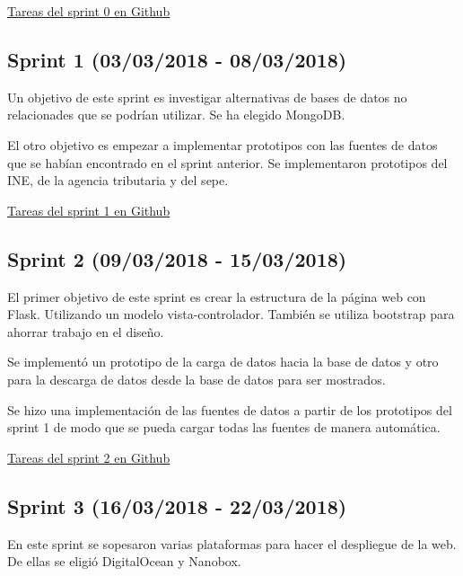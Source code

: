 
\href{https://github.com/IvanArjona/TFG-Datos-publicos/milestone/1?closed=1}{Tareas del sprint 0 en Github}

\subsection{Sprint 1 (03/03/2018 - 08/03/2018)}

Un objetivo de este sprint es investigar alternativas de bases de datos no relacionades que se podrían utilizar. Se ha elegido MongoDB.

El otro objetivo es empezar a implementar prototipos con las fuentes de datos que se habían encontrado en el sprint anterior. Se implementaron prototipos del INE, de la agencia tributaria y del sepe.


\href{https://github.com/IvanArjona/TFG-Datos-publicos/milestone/2?closed=1}{Tareas del sprint 1 en Github}

\subsection{Sprint 2 (09/03/2018 - 15/03/2018)}

El primer objetivo de este sprint es crear la estructura de la página web con Flask. Utilizando un modelo vista-controlador. También se utiliza bootstrap para ahorrar trabajo en el diseño.

Se implementó un prototipo de la carga de datos hacia la base de datos y otro para la descarga de datos desde la base de datos para ser mostrados.

Se hizo una implementación de las fuentes de datos a partir de los prototipos del sprint 1 de modo que se pueda cargar todas las fuentes de manera automática.


\href{https://github.com/IvanArjona/TFG-Datos-publicos/milestone/3?closed=1}{Tareas del sprint 2 en Github}

\subsection{Sprint 3 (16/03/2018 - 22/03/2018)}

En este sprint se sopesaron varias plataformas para hacer el despliegue de la web. De ellas se eligió DigitalOcean y Nanobox.

